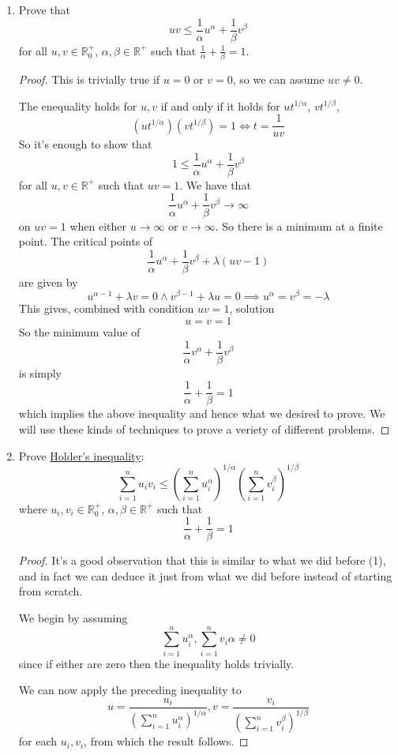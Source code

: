 \documentclass{article}
\newcommand{\reals}[0]{\mathbb{R}}
\begin{document}
\begin{enumerate}

  \item Prove that
  \[uv \leq \frac{1}{\alpha}u^\alpha + \frac{1}{\beta}v^\beta\]
  for all \(u, v \in \reals^+_0\), \(\alpha, \beta \in \reals^+\) such that \(\frac{1}{\alpha} + \frac{1}{\beta} = 1\).
  \begin{proof}
    This is trivially true if \(u = 0\) or \(v = 0\), so we can assume \(uv \neq 0\).

    The enequality holds for \(u, v\) if and only if it holds for \(ut^{1/\alpha}\), \(vt^{1/\beta}\),
    \[(ut^{1/\alpha})(vt^{1/\beta}) = 1 \iff t = \frac{1}{uv}\]
    So it's enough to show that
    \[1 \leq \frac{1}{\alpha}u^{\alpha} + \frac{1}{\beta}v^{\beta}\]
    for all \(u, v \in \reals^+\) such that \(uv = 1\).
    We have that
    \[\frac{1}{\alpha}u^\alpha + \frac{1}{\beta}v^\beta \to \infty\]
    on \(uv = 1\) when either \(u \to \infty\) or \(v \to \infty\). So there is a minimum at a finite point.
    The critical points of
    \[\frac{1}{\alpha}u^\alpha + \frac{1}{\beta}v^\beta + \lambda(uv - 1)\]
    are given by
    \[u^{\alpha - 1} + \lambda v = 0 \land v^{\beta - 1} + \lambda u = 0 \implies u^\alpha = v^\beta = -\lambda\]
    This gives, combined with condition \(uv = 1\), solution
    \[u = v = 1\]
    So the minimum value of
    \[\frac{1}{\alpha}v^\alpha + \frac{1}{\beta}v^\beta\]
    is simply
    \[\frac{1}{\alpha} + \frac{1}{\beta} = 1\]
    which implies the above inequality and hence what we desired to prove. We will use these kinds of techniques to prove a veriety of different problems.
  \end{proof}

  \item Prove \underline{Holder's inequality}:
  \[\sum_{i = 1}^nu_iv_i \leq \left(\sum_{i = 1}^nu_i^\alpha\right)^{1/\alpha}\left(\sum_{i = 1}^nv_i^\beta\right)^{1/\beta}\]
  where \(u_i, v_i \in \reals^+_0\), \(\alpha, \beta \in \reals^+\) such that
  \[\frac{1}{\alpha} + \frac{1}{\beta} = 1\]

  \begin{proof}
    It's a good observation that this is similar to what we did before (1), and in fact we can deduce it just from what we did before instead of starting from scratch.

    We begin by assuming
    \[\sum_{i = 1}^nu_i^\alpha, \sum_{i = 1}^nv_i\alpha \neq 0\]
    since if either are zero then the inequality holds trivially.

    We can now apply the preceding inequality to
    \[u = \frac{u_i}{\left(\sum_{i = 1}^nu_i^\alpha\right)^{1/\alpha}}, v = \frac{v_i}{\left(\sum_{i = 1}^nv_i^\beta\right)^{1/\beta}}\]
    for each \(u_i, v_i\), from which the result follows.
  \end{proof}


\end{enumerate}
\end{document}
